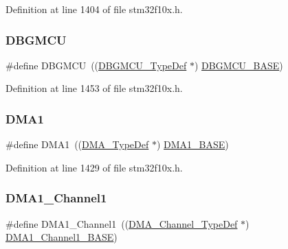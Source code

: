 Definition at line 1404 of file stm32f10x.\+h.

\mbox{\label{group___peripheral__declaration_ga92ec6d9ec2251fda7d4ce09748cd74b4}} 
\subsubsection{\texorpdfstring{D\+B\+G\+M\+CU}{DBGMCU}}
{\footnotesize\ttfamily \#define D\+B\+G\+M\+CU~((\hyperlink{struct_d_b_g_m_c_u___type_def}{D\+B\+G\+M\+C\+U\+\_\+\+Type\+Def} $\ast$) \hyperlink{group___peripheral__memory__map_ga4adaf4fd82ccc3a538f1f27a70cdbbef}{D\+B\+G\+M\+C\+U\+\_\+\+B\+A\+SE})}



Definition at line 1453 of file stm32f10x.\+h.

\mbox{\label{group___peripheral__declaration_gacc16d2a5937f7585320a98f7f6b578f9}} 
\subsubsection{\texorpdfstring{D\+M\+A1}{DMA1}}
{\footnotesize\ttfamily \#define D\+M\+A1~((\hyperlink{struct_d_m_a___type_def}{D\+M\+A\+\_\+\+Type\+Def} $\ast$) \hyperlink{group___peripheral__memory__map_gab2d8a917a0e4ea99a22ac6ebf279bc72}{D\+M\+A1\+\_\+\+B\+A\+SE})}



Definition at line 1429 of file stm32f10x.\+h.

\mbox{\label{group___peripheral__declaration_gac83c5be824be1c02716e2522e80ddf7a}} 
\subsubsection{\texorpdfstring{D\+M\+A1\+\_\+\+Channel1}{DMA1\_Channel1}}
{\footnotesize\ttfamily \#define D\+M\+A1\+\_\+\+Channel1~((\hyperlink{struct_d_m_a___channel___type_def}{D\+M\+A\+\_\+\+Channel\+\_\+\+Type\+Def} $\ast$) \hyperlink{group___peripheral__memory__map_ga888dbc1608243badeb3554ffedc7364c}{D\+M\+A1\+\_\+\+Channel1\+\_\+\+B\+A\+SE})}




